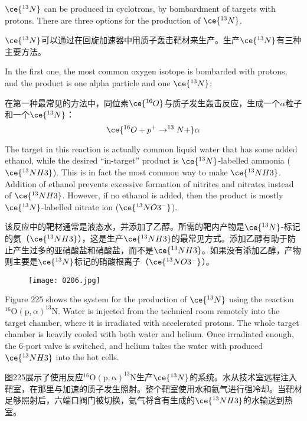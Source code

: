 \documentclass[dvipsnames, svgnames,a4paper,11pt]{article}
\begin{document}
\(\ce{^{13}N}\) can be produced in cyclotrons, by bombardment of targets with protons. There are three options for the production of \(\ce{^{13}N}\).  

\(\ce{^{13}N}\)可以通过在回旋加速器中用质子轰击靶材来生产。生产\(\ce{^{13}N}\)有三种主要方法。

In the first one, the most common oxygen isotope is bombarded with protons, and the product is one alpha particle and one \(\ce{^{13}N}\):

在第一种最常见的方法中，同位素\(\ce{^{16}O}\)与质子发生轰击反应，生成一个$\alpha$粒子和一个\(\ce{^{13}N}\)：
\[
\ce{^{16}O + p^+ \to ^{13}N + }\alpha
\]

The target in this reaction is actually common liquid water that has some added ethanol, while the desired “in-target” product is \(\ce{^{13}N}\)-labelled ammonia (\(\ce{^{13}NH3}\)). This is in fact the most common way to make \(\ce{^{13}NH3}\). Addition of ethanol prevents excessive formation of nitrites and nitrates instead of \(\ce{^{13}NH3}\). However, if no ethanol is added, then the product is mostly \(\ce{^{13}N}\)-labelled nitrate ion (\(\ce{^{13}NO3^{-}}\)).

该反应中的靶材通常是液态水，并添加了乙醇。所需的靶内产物是\(\ce{^{13}N}\)-标记的氨（\(\ce{^{13}NH3}\)），这是生产\(\ce{^{13}NH3}\)的最常见方式。添加乙醇有助于防止产生过多的亚硝酸盐和硝酸盐，而不是\(\ce{^{13}NH3}\)。如果没有添加乙醇，产物则主要是\(\ce{^{13}N}\)标记的硝酸根离子（\(\ce{^{13}NO3^-}\)）。

\begin{figure}[h]
	\centering
    \texttt{[image: 0206.jpg]}  
     \label{fig255}
\end{figure}

Figure 225 shows the system for the production of \(\ce{^{13}N}\) using the reaction \(\mathrm{^{16}O(p,\alpha)^{13}N}\). Water is injected from the technical room remotely into the target chamber, where it is irradiated with accelerated protons. The whole target chamber is heavily cooled with both water and helium. Once irradiated enough, the 6-port valve is switched, and helium takes the water with produced \(\ce{^{13}NH3}\) into the hot cells.

图225展示了使用反应\(\mathrm{^{16}O(p, \alpha)^{13}N}\)生产\(\ce{^{13}N}\)的系统。水从技术室远程注入靶室，在那里与加速的质子发生照射。整个靶室使用水和氦气进行强冷却。当靶材足够照射后，六端口阀门被切换，氦气将含有生成的\(\ce{^{13}NH3}\)的水输送到热室。
\end{document}
